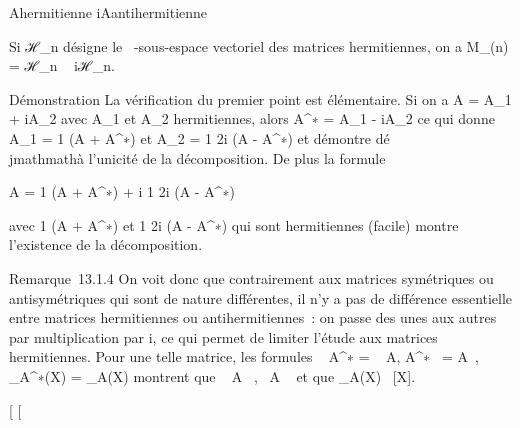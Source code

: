 \documentclass[]{article}
\begin{document}
A\text hermitienne  \Leftrightarrow
iA\text antihermitienne

Si ℋ_n désigne le ~-sous-espace vectoriel des matrices
hermitiennes, on a M_(n) = ℋ_n \oplus~ iℋ_n.

Démonstration La vérification du premier point est élémentaire. Si on a
A = A_1 + iA_2 avec A_1 et A_2
hermitiennes, alors A^∗ = A_1 - iA_2 ce qui
donne A_1 = 1  (A + A^∗)
et A_2 = 1 \over 2i (A - A^∗) et
démontre dé\\jmathmathà l'unicité de la décomposition. De plus la formule

A = 1  (A + A^∗) + i 1
\over 2i (A - A^∗)

avec  1  (A + A^∗) et  1
\over 2i (A - A^∗) qui sont hermitiennes
(facile) montre l'existence de la décomposition.

Remarque~13.1.4 On voit donc que contrairement aux matrices symétriques
ou antisymétriques qui sont de nature différentes, il n'y a pas de
différence essentielle entre matrices hermitiennes ou antihermitiennes~:
on passe des unes aux autres par multiplication par i, ce qui permet de
limiter l'étude aux matrices hermitiennes. Pour une telle matrice, les
formules ~
A^∗ =
\overline{}~
A,
A^∗~ =
\overline{}A~,
\chi_A^∗(X) =
\overline\chi_A(X) montrent que
~ A \in {}~,
~A \in {}~ et que
\chi_A(X) \in {}~{[}X{]}.

{[}
{[}
\end{document}
